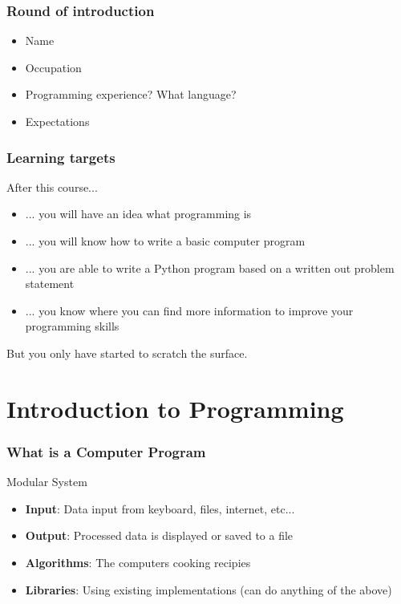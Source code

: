 \documentclass[10pt, a4paper]{beamer} %
\begin{document}
\begin{frame}[c]\frametitle{Round of introduction}
  \begin{itemize}
    \item Name
    \item Occupation
    \item Programming experience? What language?
    \item Expectations
  \end{itemize}
\end{frame}

\begin{frame}[c]\frametitle{Learning targets}
  
After this course...
\begin{itemize}
  \item ... you will have an idea what programming is
  \item ... you will know how to write a basic computer program
  \item ... you are able to write a Python program based on a written out
  problem statement
  \item ... you know where you can find more information to improve your
  programming skills
\end{itemize}

But you only have started to scratch the surface.
\end{frame}


\section{Introduction to Programming} %
\label{sec:introduction_to_programming}

\begin{frame}[c]\frametitle{What is a Computer Program}
\begin{block}{Modular System}
  \begin{itemize}
    \item \textbf{Input}: Data input from keyboard, files, internet, etc...
    \item \textbf{Output}: Processed data is displayed or saved to a file
    \item \textbf{Algorithms}: The computers cooking recipies
    \item \textbf{Libraries}: Using existing implementations (can do anything of the above)
  \end{itemize}

\end{block}   
\end{frame}
\end{document}
